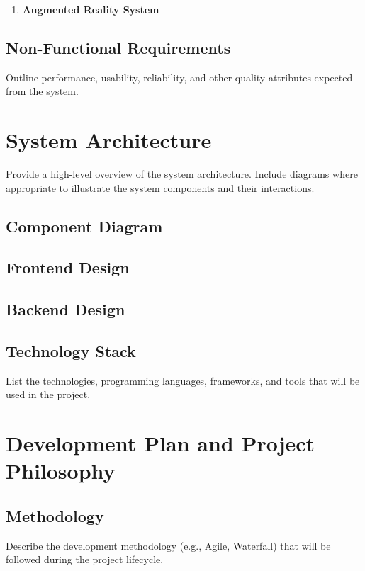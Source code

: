 \documentclass[12pt]{article}
\begin{document}
    \begin{enumerate}
        \item \textbf{Augmented Reality System}
    \end{enumerate}

    \subsection{Non-Functional Requirements}
    Outline performance, usability, reliability, and other quality attributes expected from the system.

\section{System Architecture}
Provide a high-level overview of the system architecture. Include diagrams where appropriate to illustrate the system components and their interactions.

    \subsection{Component Diagram}
    \begin{center}
    \end{center}

    \subsection{Frontend Design}

    \subsection{Backend Design}

    \subsection{Technology Stack}
    List the technologies, programming languages, frameworks, and tools that will be used in the project.

\section{Development Plan and Project Philosophy}

    \subsection{Methodology}
    Describe the development methodology (e.g., Agile, Waterfall) that will be followed during the project lifecycle.
\end{document}
